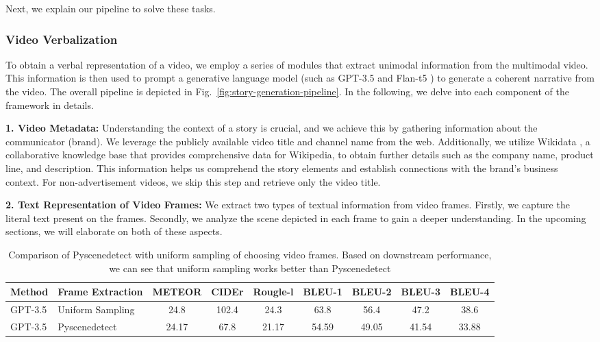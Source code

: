 \documentclass[hidelinks,11pt,a4paper]{report}
\renewcommand{\cite}[1]{\citep{#1}}
\begin{document}
Next, we explain our pipeline to solve these tasks.

\subsubsection{Video Verbalization} 
To obtain a verbal representation of a video, we employ a series of modules that extract unimodal information from the multimodal video. This information is then used to prompt a generative language model (such as GPT-3.5 \cite{brown2020language} and Flan-t5 \cite{chung2022scaling}) to generate a coherent narrative from the video. The overall pipeline is depicted in Fig.~\ref{fig:story-generation-pipeline}. In the following, we delve into each component of the framework in details.

\noindent \textbf{1. Video Metadata:} Understanding the context of a story is crucial, and we achieve this by gathering information about the communicator (brand). We leverage the publicly available video title and channel name from the web. Additionally, we utilize Wikidata \cite{10.1145/2629489}, a collaborative knowledge base that provides comprehensive data for Wikipedia, to obtain further details such as the company name, product line, and description. This information helps us comprehend the story elements and establish connections with the brand's business context. For non-advertisement videos, we skip this step and retrieve only the video title.

\noindent \textbf{2. Text Representation of Video Frames:} We extract two types of textual information from video frames. Firstly, we capture the literal text present on the frames. Secondly, we analyze the scene depicted in each frame to gain a deeper understanding. In the upcoming sections, we will elaborate on both of these aspects.


\begin{table}[!h]\centering
\begin{adjustbox}{width =\textwidth}
\begin{tabular}{llccccccc}\toprule[1.5pt]
\textbf{Method} &\textbf{Frame Extraction} &\textbf{METEOR} & \textbf{CIDEr} &\textbf{Rougle-l} &\textbf{BLEU-1}&\textbf{BLEU-2}&\textbf{BLEU-3}&\textbf{BLEU-4}\\\toprule[0.5pt]
GPT-3.5 & Uniform Sampling & 24.8 & 102.4 & 24.3 & 63.8 & 56.4 & 47.2 & 38.6 \\
GPT-3.5 & Pyscenedetect & 24.17 & 67.8 & 21.17 & 54.59 & 49.05 & 41.54 & 33.88 \\\bottomrule[1.5pt]
\end{tabular}
\end{adjustbox}
\caption{Comparison of Pyscenedetect \cite{breakthrough-pyscenedetect} with uniform sampling of choosing video frames. Based on downstream performance, we can see that uniform sampling works better than Pyscenedetect  \label{tab:ablation-sampling}}
\end{table}
\end{document}
